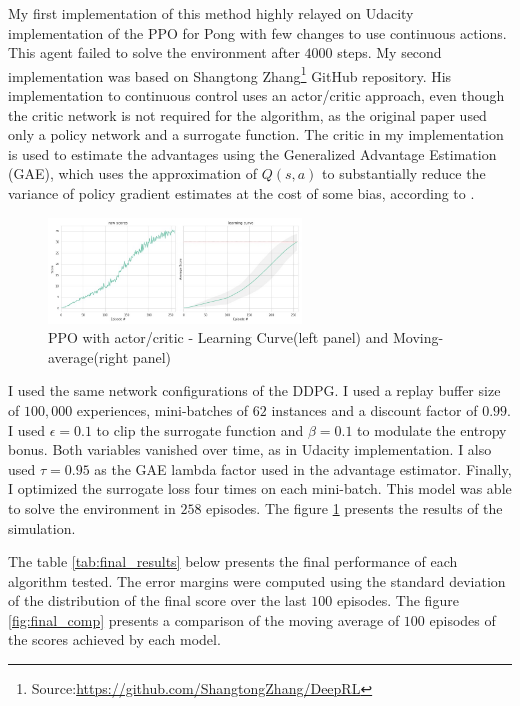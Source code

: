 \documentclass[a4paper]{article}
\begin{document}
My first implementation of this method highly relayed on Udacity implementation of the PPO for Pong with few changes to use continuous actions. This agent failed to solve the environment after $4000$ steps. My second implementation was based on Shangtong Zhang\footnote{Source:\url{https://github.com/ShangtongZhang/DeepRL}} GitHub repository. His implementation to continuous control uses an actor/critic approach, even though the critic network is not required for the algorithm, as the original paper used only a policy network and a surrogate function. The critic in my implementation is used to estimate the advantages using the Generalized Advantage Estimation (GAE), which uses the approximation of $Q(s, a)$ to substantially reduce the variance of policy gradient estimates at the cost of some bias, according to \cite{Schulman2015HighDimensionalCC}.

\begin{figure}[ht]
\centering
\includegraphics[width=0.60\textwidth]{../notebooks/figures/2018-10-22-PPO-learning-curve.jpg}
\caption{PPO with actor/critic - Learning Curve(left panel) and Moving-average(right panel)}
\label{fig:ppo}
\end{figure}


I used the same network configurations of the DDPG. I used a replay buffer size of $100,000$ experiences, mini-batches of $62$ instances and a discount factor of $0.99$. I used $\epsilon=0.1$ to clip the surrogate function and $\beta=0.1$ to modulate the entropy bonus. Both variables vanished over time, as in Udacity implementation. I also used $\tau=0.95$ as the GAE lambda factor used in the advantage estimator. Finally, I optimized the surrogate loss four times on each mini-batch. This model was able to solve the environment in $258$ episodes. The figure \ref{fig:ppo} presents the results of the simulation.


The table \ref{tab:final_results} below presents the final performance of each algorithm tested. The error margins were computed using the standard deviation of the distribution of the final score over the last $100$ episodes. The figure \ref{fig:final_comp} presents a comparison of the moving average of $100$ episodes of the scores achieved by each model.
\end{document}
